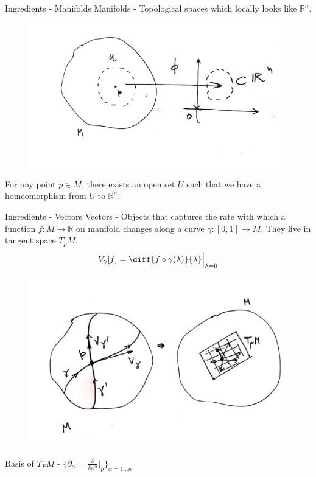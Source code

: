 \documentclass{beamer}
\begin{document}
\begin{frame}{Ingredients - Manifolds}
    Manifolds - Topological spaces which locally looks like $\mathbb{R}^{n}$.
    \begin{figure}
        \centering
        \includegraphics[scale=0.08]{Images/image_6.jpeg}
        \label{fig:fig_1}
    \end{figure}
    For any point $p\in M$, there exists an open set $U$ such that we have a homeomorphism from $U$ to $\mathbb{R}^{n}$.
\end{frame}
\begin{frame}{Ingredients - Vectors}
    Vectors - Objects that captures the rate with which a function $f\colon M\to \mathbb{R}$ on manifold changes along a curve $\gamma\colon [0, 1]\to M$. They live in tangent space $T_{p}M$.
    \begin{equation*}
        V_{\gamma}[f] = \diff{f\circ\gamma(\lambda)}{\lambda}\Bigr|_{\lambda = 0}
    \end{equation*}
    \begin{figure}
        \centering
        \includegraphics[scale=0.06]{Images/image_8.jpeg}
        \label{fig:fig_2}
    \end{figure}
    Basis of $T_{P}M$ - $\{\partial_{\alpha} = \frac{\partial}{\partial x ^{\alpha}}\Bigr|_{p}\}_{\alpha = 1\dots n}$
\end{frame}
\end{document}
